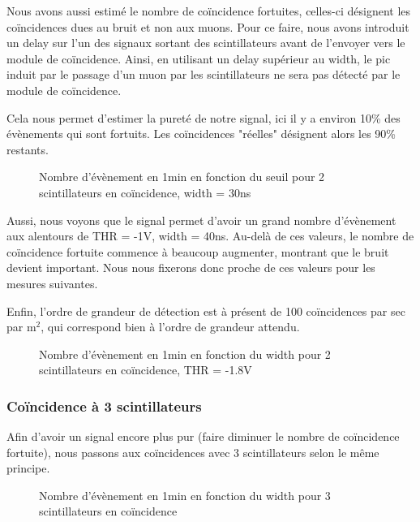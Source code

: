 \documentclass[a4paper,12pt,twoside]{article}
\begin{document}
Nous avons aussi estimé le nombre de coïncidence fortuites, celles-ci désignent les coïncidences dues au bruit et non aux muons. Pour ce faire, nous avons introduit un delay sur l’un des signaux sortant des scintillateurs avant de l’envoyer vers le module de coïncidence. Ainsi, en utilisant un delay supérieur au width, le pic induit par le passage d’un muon par les scintillateurs ne sera pas détecté par le module de coïncidence.

Cela nous permet d’estimer la pureté de notre signal, ici il y a environ 10\% des évènements qui sont fortuits. Les coïncidences "réelles" désignent alors les 90\% restants.

\begin{figure}[ht!]
    \centering
    \caption[Nombre d’évènement en 1min en fonction du seuil]{Nombre d’évènement en 1min en fonction du seuil pour 2 scintillateurs en coïncidence, width = 30ns}
\end{figure}

Aussi, nous voyons que le signal permet d’avoir un grand nombre d’évènement aux alentours de THR = -1V, width = 40ns. Au-delà de ces valeurs, le nombre de coïncidence fortuite commence à beaucoup augmenter, montrant que le bruit devient important. Nous nous fixerons donc proche de ces valeurs pour les mesures suivantes.

Enfin, l’ordre de grandeur de détection est à présent de 100 coïncidences par sec par m$^2$, qui correspond bien à l’ordre de grandeur attendu.

\begin{figure}[h!]
    \centering
    \caption{Nombre d’évènement en 1min en fonction du width pour 2 scintillateurs en coïncidence, THR = -1.8V}
\end{figure}

\subsubsection{Coïncidence à 3 scintillateurs}
Afin d’avoir un signal encore plus pur (faire diminuer le nombre de coïncidence fortuite), nous passons aux coïncidences avec 3 scintillateurs selon le même principe.

\begin{figure}[h!]
    \centering
    \caption{Nombre d’évènement en 1min en fonction du width pour 3 scintillateurs en coïncidence}
\end{figure}
\end{document}
